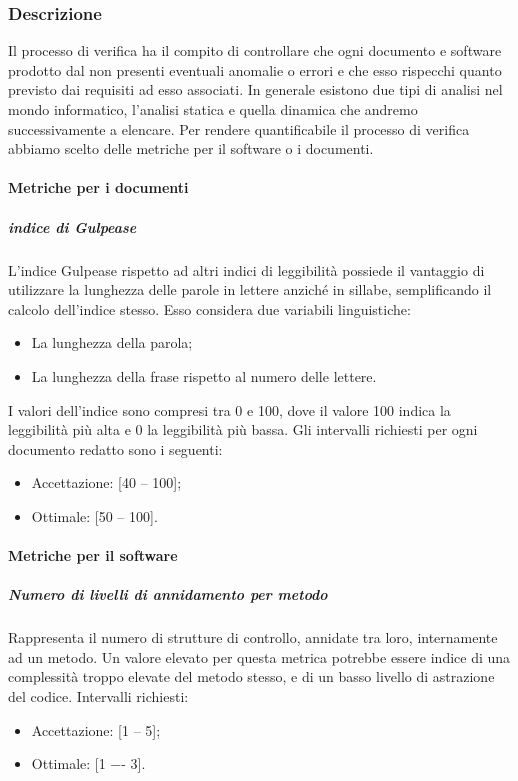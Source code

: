 \subsubsection{Descrizione}
Il processo di verifica ha il compito di controllare che ogni documento e software prodotto dal  non presenti eventuali anomalie o errori e che esso rispecchi quanto previsto dai requisiti ad esso associati. In generale esistono due tipi di analisi nel mondo informatico, l'analisi statica e quella dinamica che andremo successivamente a elencare. Per rendere quantificabile il processo di verifica abbiamo scelto delle metriche per il software o i documenti.

\paragraph{Metriche per i documenti}
\subparagraph{indice di Gulpease}
L'indice Gulpease rispetto ad altri indici di leggibilità possiede il vantaggio di utilizzare la lunghezza delle parole in lettere anziché in sillabe, semplificando il calcolo dell'indice stesso. Esso considera due variabili linguistiche:
\begin{itemize}
\item La lunghezza della parola;
\item La lunghezza della frase rispetto al numero delle lettere.
\end{itemize}

I valori dell'indice sono compresi tra 0 e 100, dove il valore 100 indica la leggibilità più alta e 0 la leggibilità più bassa.
Gli intervalli richiesti per ogni documento redatto sono i seguenti:
\begin{itemize}
\item Accettazione: [40 -- 100];
\item Ottimale: [50 -- 100].
\end{itemize}
\paragraph{Metriche per il software}

\subparagraph{Numero di livelli di annidamento per metodo}
Rappresenta il numero di strutture di controllo, annidate tra loro, internamente ad un metodo.
Un valore elevato per questa metrica potrebbe essere indice di una complessità troppo elevate del metodo stesso, e di un basso livello di astrazione del codice.
Intervalli richiesti:
\begin{itemize}
\item
Accettazione: [1 -- 5];
\item
Ottimale: [1 −- 3].
\end{itemize}

